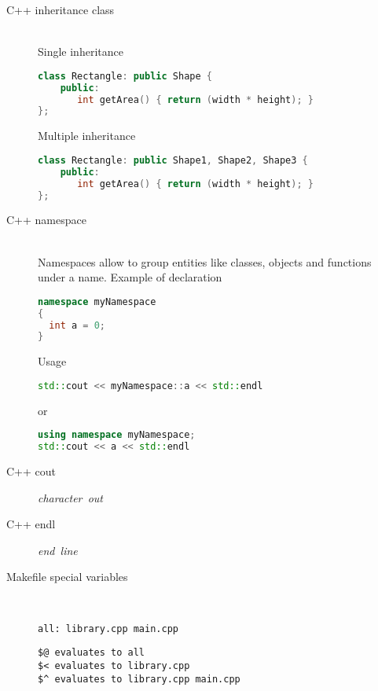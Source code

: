 \documentclass{article}
\begin{document}
\begin{description}
    \item[C++ inheritance class] \mbox{}\\ Single inheritance
\begin{lstlisting}[language=C++]
class Rectangle: public Shape {
    public:
       int getArea() { return (width * height); }
};
\end{lstlisting}
    Multiple inheritance
\begin{lstlisting}[language=C++]
class Rectangle: public Shape1, Shape2, Shape3 {
    public:
       int getArea() { return (width * height); }
};
\end{lstlisting}
    \item[C++ namespace] \mbox{}\\ Namespaces allow to group entities like classes, objects and functions under a name. Example of declaration
\begin{lstlisting}[language=C++]
namespace myNamespace
{
  int a = 0;
}
\end{lstlisting}

    Usage

\begin{lstlisting}[language=C++]
std::cout << myNamespace::a << std::endl
\end{lstlisting}
    or
\begin{lstlisting}[language=C++]
using namespace myNamespace;
std::cout << a << std::endl
\end{lstlisting}

    \item[C++ cout] \mbox{\textit{character out}}\\
    \item[C++ endl] \mbox{\textit{end line}}\\ 
    \item[Makefile special variables] \mbox{}\\
      
\begin{lstlisting}
all: library.cpp main.cpp
\end{lstlisting}

\begin{lstlisting}
$@ evaluates to all 
$< evaluates to library.cpp
$^ evaluates to library.cpp main.cpp
\end{lstlisting}

\end{description}
\end{document}
